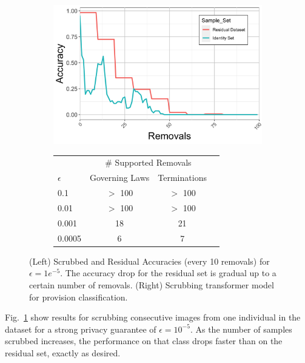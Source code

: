 \begin{figure}
\begin{subfigure}{0.45\columnwidth}\centering
    \includegraphics[width=0.98\columnwidth]{5_unlearn/figs/scrub/VGG_Scrub_1.png}%
    \label{fig:vgg}
\end{subfigure}
\begin{subfigure}{0.45\columnwidth}
    \centering
    \begin{tabular}[b]{l|ccc}
        \hline\hline
        & \multicolumn{2}{c}{\# Supported Removals}  \\
        $\epsilon$ & Governing Laws & Terminations \\
        \hline
        0.1 & $>$ 100 & $>$ 100 \\
        0.01 & $>$ 100 & $>$ 100 \\
        0.001 & 18 & 21 \\
        0.0005 & 6 & 7 \\
        \hline\hline
    \end{tabular}%
    \label{tab:nlp}
\end{subfigure}

\caption[important image]{(Left) Scrubbed and Residual Accuracies (every 10 removals) for $\epsilon = 1e^{-5}$. The accuracy drop for the residual set is gradual up to a certain number of removals. (Right) Scrubbing transformer model for provision classification.}
\label{fig:combine}
\end{figure}

Fig.~\ref{fig:vgg} show results for scrubbing consecutive images from one individual in the dataset for a strong privacy guarantee of $\epsilon=10^{-5}$. As the number of samples scrubbed increases, the performance on that class drops faster than on the residual set, exactly as desired.

